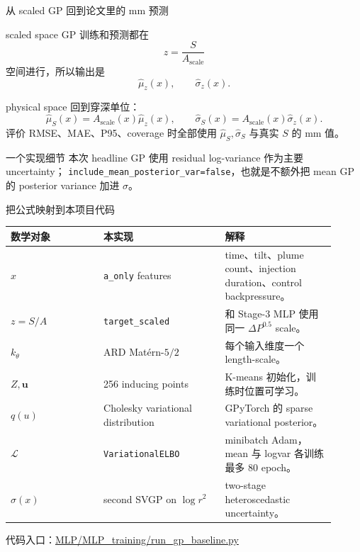 \documentclass[aspectratio=169,11pt]{beamer}
\newcommand{\sourcepath}[1]{{\scriptsize\url{#1}}}
\begin{document}
\begin{frame}{从 scaled GP 回到论文里的 mm 预测}
\small
\begin{block}{scaled space}
\footnotesize
GP 训练和预测都在
\[
z=\frac{S}{A_{\mathrm{scale}}}
\]
空间进行，所以输出是
\[
\hat\mu_z(x),\qquad \hat\sigma_z(x).
\]
\end{block}

\begin{block}{physical space}
\footnotesize
回到穿深单位：
\[
\hat\mu_S(x)=A_{\mathrm{scale}}(x)\hat\mu_z(x),
\qquad
\hat\sigma_S(x)=A_{\mathrm{scale}}(x)\hat\sigma_z(x).
\]
评价 RMSE、MAE、P95、coverage 时全部使用 \(\hat\mu_S,\hat\sigma_S\) 与真实 \(S\) 的 mm 值。
\end{block}

\begin{block}{一个实现细节}
\footnotesize
本次 headline GP 使用 residual log-variance 作为主要 uncertainty；
\texttt{include\_mean\_posterior\_var=false}，也就是不额外把 mean GP 的 posterior variance 加进 \(\sigma\)。
\end{block}
\end{frame}

\begin{frame}{把公式映射到本项目代码}
\scriptsize
\begin{tabular}{L{0.26\linewidth}L{0.34\linewidth}L{0.31\linewidth}}
\toprule
数学对象 & 本实现 & 解释 \\
\midrule
\(x\) &
\texttt{a\_only} features &
time、tilt、plume count、injection duration、control backpressure。 \\
\(z=S/A\) &
\texttt{target\_scaled} &
和 Stage-3 MLP 使用同一 \(\Delta P^{0.5}\) scale。 \\
\(k_\theta\) &
ARD Matérn-\(5/2\) &
每个输入维度一个 length-scale。 \\
\(Z,\mathbf u\) &
256 inducing points &
K-means 初始化，训练时位置可学习。 \\
\(q(u)\) &
Cholesky variational distribution &
GPyTorch 的 sparse variational posterior。 \\
\(\mathcal L\) &
\texttt{VariationalELBO} &
minibatch Adam，mean 与 logvar 各训练最多 80 epoch。 \\
\(\sigma(x)\) &
second SVGP on \(\log r^2\) &
two-stage heteroscedastic uncertainty。 \\
\bottomrule
\end{tabular}

\vspace{0.5em}
\footnotesize
代码入口：\sourcepath{MLP/MLP_training/run_gp_baseline.py}
\end{frame}
\end{document}
